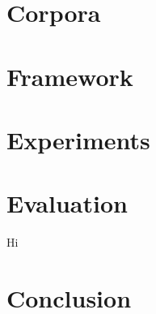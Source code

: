 \documentclass[11pt]{article}
\begin{document}
\section{Corpora}

\section{Framework}

\section{Experiments}
\section{Evaluation} 
Hi
\section{Conclusion}



\end{document}
